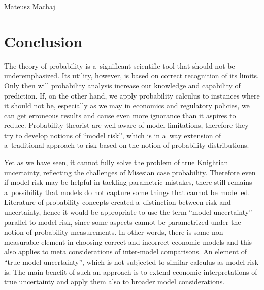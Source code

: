 \begin{artengenv}{Mateusz Machaj}
\section{Conclusion}

The theory of probability is a~significant scientific tool that should not be underemphasized. Its utility, however, is based on correct recognition of its limits. Only then will probability analysis increase our knowledge and capability of prediction. If, on the other hand, we apply probability calculus to instances where it should not be, especially as we may in economics and regulatory policies, we can get erroneous results and cause even more ignorance than it aspires to reduce. Probability theorist are well aware of model limitations, therefore they try to develop notions of ``model risk'', which is in a~way extension of a~traditional approach to risk based on the notion of probability distributions.



Yet as we have seen, it cannot fully solve the problem of true Knightian uncertainty, reflecting the challenges of Misesian case probability. Therefore even if model risk may be helpful in tackling parametric mistakes, there still remains a~possibility that models do not capture some things that cannot be modelled. Literature of probability concepts created a~distinction between risk and uncertainty, hence it would be appropriate to use the term ``model uncertainty'' parallel to model risk, since some aspects cannot be parametrized under the notion of probability measurements. In other words, there is some non-measurable element in choosing correct and incorrect economic models and this also applies to meta considerations of inter-model comparisons. An element of ``true model uncertainty'', which is not subjected to similar calculus as model risk is. The main benefit of such an approach is to extend economic interpretations of true uncertainty and apply them also to broader model considerations.







\end{artengenv}

\label{machaj-lastpage}